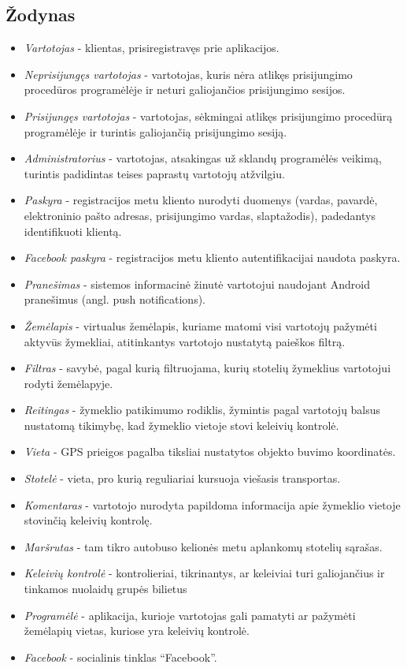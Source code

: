 \documentclass{VUMIFPSkursinis}
\begin{document}
\subsection{Žodynas}
				\renewcommand{\labelitemi}{$\bullet$}
				\begin{itemize}[itemsep=-2mm]
					\item \textit{Vartotojas} - klientas, prisiregistravęs prie aplikacijos.
					\item \textit{Neprisijungęs vartotojas} - vartotojas, kuris nėra atlikęs prisijungimo procedūros programėlėje ir neturi galiojančios prisijungimo sesijos.
					\item \textit{Prisijungęs vartotojas} - vartotojas, sėkmingai atlikęs prisijungimo procedūrą programėlėje ir turintis galiojančią prisijungimo sesiją.
					\item \textit{Administratorius} - vartotojas, atsakingas už sklandų programėlės veikimą, turintis padidintas teises paprastų vartotojų atžvilgiu.
					\item \textit{Paskyra} - registracijos metu kliento nurodyti duomenys (vardas, pavardė, elektroninio pašto adresas, prisijungimo vardas, slaptažodis), padedantys identifikuoti klientą.
					\item \textit{Facebook paskyra} - registracijos metu kliento autentifikacijai naudota paskyra.
					\item \textit{Pranešimas} - sistemos informacinė žinutė vartotojui naudojant Android pranešimus (angl. push notifications).
					\item \textit{Žemėlapis} - virtualus žemėlapis, kuriame matomi visi vartotojų pažymėti aktyvūs žymekliai, atitinkantys vartotojo nustatytą paieškos filtrą.
					\item \textit{Filtras} - savybė, pagal kurią filtruojama, kurių stotelių žymeklius vartotojui rodyti žemėlapyje.
					\item \textit{Reitingas} - žymeklio patikimumo rodiklis, žymintis pagal vartotojų balsus nustatomą tikimybę, kad žymeklio vietoje stovi keleivių kontrolė. 
					\item \textit{Vieta} - GPS prieigos pagalba tiksliai nustatytos objekto buvimo koordinatės.
					\item \textit{Stotelė} - vieta, pro kurią reguliariai kursuoja viešasis transportas.
					\item \textit{Komentaras} - vartotojo nurodyta papildoma informacija apie žymeklio vietoje stovinčią keleivių kontrolę.
					\item \textit{Maršrutas} - tam tikro autobuso kelionės metu aplankomų stotelių sąrašas.
					\item \textit{Keleivių kontrolė} - kontrolieriai, tikrinantys, ar keleiviai turi galiojančius ir tinkamos nuolaidų grupės bilietus
					\item \textit{Programėlė} - aplikacija, kurioje vartotojas gali pamatyti ar pažymėti žemėlapių vietas, kuriose yra keleivių kontrolė.
					\item \textit{Facebook} - socialinis tinklas “Facebook”.
				\end{itemize}
\end{document}
